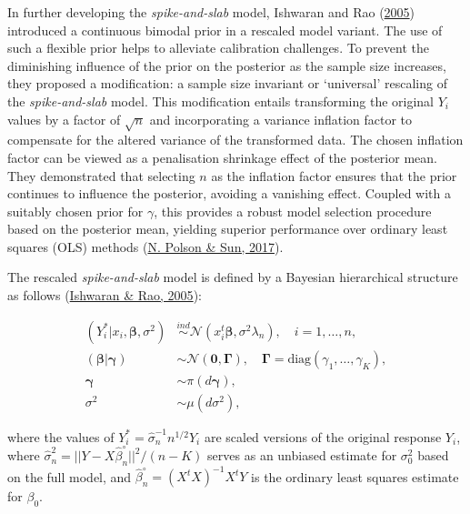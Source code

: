 \documentclass[
  11pt,
]{article}
\begin{document}
In further developing the \emph{spike-and-slab} model, Ishwaran and Rao
(\protect\hyperlink{ref-Ishwaran2005}{2005}) introduced a continuous
bimodal prior in a rescaled model variant. The use of such a flexible
prior helps to alleviate calibration challenges. To prevent the
diminishing influence of the prior on the posterior as the sample size
increases, they proposed a modification: a sample size invariant or
`universal' rescaling of the \emph{spike-and-slab} model. This
modification entails transforming the original \(Y_i\) values by a
factor of \(\sqrt{n}\) and incorporating a variance inflation factor to
compensate for the altered variance of the transformed data. The chosen
inflation factor can be viewed as a penalisation shrinkage effect of the
posterior mean. They demonstrated that selecting \(n\) as the inflation
factor ensures that the prior continues to influence the posterior,
avoiding a vanishing effect. Coupled with a suitably chosen prior for
\(\gamma\), this provides a robust model selection procedure based on
the posterior mean, yielding superior performance over ordinary least
squares (OLS) methods (\protect\hyperlink{ref-Polson2017}{N. Polson \&
Sun, 2017}).

The rescaled \emph{spike-and-slab} model is defined by a Bayesian
hierarchical structure as follows
(\protect\hyperlink{ref-Ishwaran2005}{Ishwaran \& Rao, 2005}):

\begin{equation}
\begin{aligned}
    (Y_i^* | x_i, \boldsymbol{\beta}, \sigma^2) &\stackrel{ind}\sim \mathcal{N}(x_i^t \boldsymbol{\beta}, \sigma^2 \lambda_n), \quad i = 1, \ldots, n, \\
    (\boldsymbol{\beta} | \boldsymbol{\gamma}) &\sim \mathcal{N}(\mathbf{0}, \boldsymbol{\Gamma}), \quad \boldsymbol{\Gamma} = \text{diag}(\gamma_1, \ldots, \gamma_K), \\
    \boldsymbol{\gamma} &\sim \pi(d\boldsymbol{\gamma}), \\
    \sigma^2 &\sim \mu(d\sigma^2),
\end{aligned}
\end{equation}

where the values of \(Y_i^* = \hat{\sigma}_n^{-1} n^{1/2} Y_i\) are
scaled versions of the original response \(Y_i\), where
\(\hat{\sigma}_n^2 = ||Y-X\hat{\beta}_n^{\circ}||^2 / (n-K)\) serves as
an unbiased estimate for \(\sigma_0^2\) based on the full model, and
\(\hat{\beta}_n^{\circ} = (X^tX)^{-1} X^tY\) is the ordinary least
squares estimate for \(\beta_0\).
\end{document}
